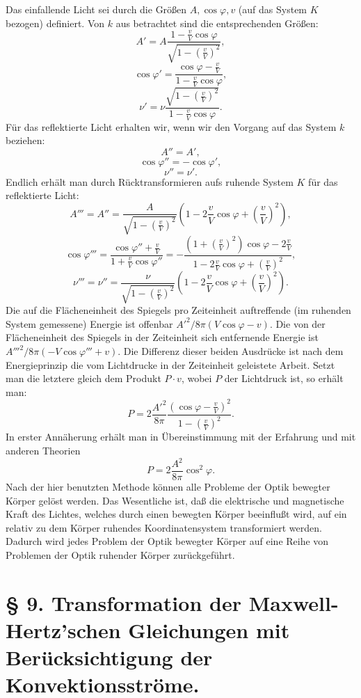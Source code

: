 \documentclass[17pt]{webarticle}       %
\begin{document}
Das einfallende Licht sei durch die Größen \( A, \cos \varphi, v \) (auf das System \( K \) bezogen) definiert. Von \( k \) aus betrachtet sind die entsprechenden Größen:
\[
A' = A \frac{1 - \frac{v}{V} \cos \varphi}{\sqrt{1 - \left( \frac{v}{V} \right)^2}},
\]
\[
\cos \varphi' = \frac{\cos \varphi - \frac{v}{V}}{1 - \frac{v}{V} \cos \varphi},
\]
\[
\nu' = \nu \frac{\sqrt{1 - \left( \frac{v}{V} \right)^2}}{1 - \frac{v}{V} \cos \varphi}.
\]
Für das reflektierte Licht erhalten wir, wenn wir den Vorgang auf das System \( k \) beziehen:
\[
A'' = A',
\]
\[
\cos \varphi'' = - \cos \varphi',
\]
\[
\nu'' = \nu'.
\]
Endlich erhält man durch Rücktransformieren aufs ruhende System \( K \) für das reflektierte Licht:
\[
A''' = A'' = \frac{A}{\sqrt{1 - \left( \frac{v}{V} \right)^2}} \left( 1 - 2 \frac{v}{V} \cos \varphi + \left( \frac{v}{V} \right)^2 \right),
\]
\[
\cos \varphi''' = \frac{\cos \varphi'' + \frac{v}{V}}{1 + \frac{v}{V} \cos \varphi''} = - \frac{\left( 1 + \left( \frac{v}{V} \right)^2 \right) \cos \varphi - 2 \frac{v}{V}}{1 - 2 \frac{v}{V} \cos \varphi + \left( \frac{v}{V} \right)^2},
\]
\[
\nu''' = \nu'' = \frac{\nu}{\sqrt{1 - \left( \frac{v}{V} \right)^2}} \left( 1 - 2 \frac{v}{V} \cos \varphi + \left( \frac{v}{V} \right)^2 \right).
\]
Die auf die Flächeneinheit des Spiegels pro Zeiteinheit auftreffende (im ruhenden System gemessene) Energie ist offenbar \( A'^2 / 8\pi (V \cos \varphi - v) \). Die von der Flächeneinheit des Spiegels in der Zeiteinheit sich entfernende Energie ist \( A'''^2 / 8\pi (-V \cos \varphi''' + v) \). Die Differenz dieser beiden Ausdrücke ist nach dem Energieprinzip die vom Lichtdrucke in der Zeiteinheit geleistete Arbeit. Setzt man die letztere gleich dem Produkt \( P \cdot v \), wobei \( P \) der Lichtdruck ist, so erhält man:
\[
P = 2 \frac{A'^2}{8\pi} \frac{( \cos \varphi - \frac{v}{V} )^2}{1 - \left( \frac{v}{V} \right)^2}.
\]
In erster Annäherung erhält man in Übereinstimmung mit der Erfahrung und mit anderen Theorien
\[
P = 2 \frac{A^2}{8\pi} \cos^2 \varphi.
\]
Nach der hier benutzten Methode können alle Probleme der Optik bewegter Körper gelöst werden. Das Wesentliche ist, daß die elektrische und magnetische Kraft des Lichtes, welches durch einen bewegten Körper beeinflußt wird, auf ein relativ zu dem Körper ruhendes Koordinatensystem transformiert werden. Dadurch wird jedes Problem der Optik bewegter Körper auf eine Reihe von Problemen der Optik ruhender Körper zurückgeführt.



\section*{§ 9. Transformation der Maxwell-Hertz'schen Gleichungen mit Berücksichtigung der Konvektionsströme.}
\end{document}
